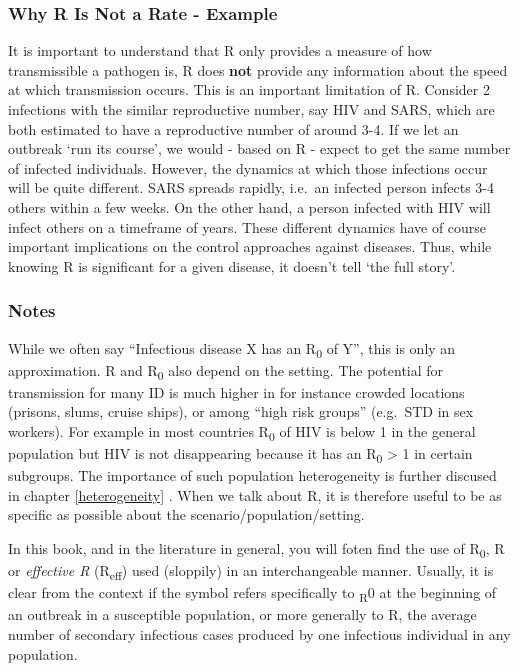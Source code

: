 \documentclass[
]{book}
\begin{document}
\hypertarget{myexamplebox}{%
\subsubsection{Why R Is Not a Rate - Example}\label{myexamplebox}}

It is important to understand that R only provides a measure of how transmissible a pathogen is, R does \textbf{not} provide any information about the speed at which transmission occurs. This is an important limitation of R. Consider 2 infections with the similar reproductive number, say HIV and SARS, which are both estimated to have a reproductive number of around 3-4. If we let an outbreak `run its course', we would - based on R - expect to get the same number of infected individuals. However, the dynamics at which those infections occur will be quite different. SARS spreads rapidly, i.e.~an infected person infects 3-4 others within a few weeks. On the other hand, a person infected with HIV will infect others on a timeframe of years. These different dynamics have of course important implications on the control approaches against diseases. Thus, while knowing R is significant for a given disease, it doesn't tell `the full story'.

\hypertarget{mynotebox}{%
\subsubsection{Notes}\label{mynotebox}}

While we often say ``Infectious disease X has an R\textsubscript{0} of Y'', this is only an approximation. R and R\textsubscript{0} also depend on the setting. The potential for transmission for many ID is much higher in for instance crowded locations (prisons, slums, cruise ships), or among ``high risk groups'' (e.g.~STD in sex workers). For example in most countries R\textsubscript{0} of HIV is below 1 in the general population but HIV is not disappearing because it has an R\textsubscript{0} \textgreater{} 1 in certain subgroups. The importance of such population heterogeneity is further discused in chapter \ref{heterogeneity} . When we talk about R, it is therefore useful to be as specific as possible about the scenario/population/setting.

In this book, and in the literature in general, you will foten find the use of R\textsubscript{0}, R or \emph{effective R} (R\textsubscript{eff}) used (sloppily) in an interchangeable manner. Usually, it is clear from the context if the symbol refers specifically to \textsubscript{R}0 at the beginning of an outbreak in a susceptible population, or more generally to R, the average number of secondary infectious cases produced by one infectious individual in any population.
\end{document}
